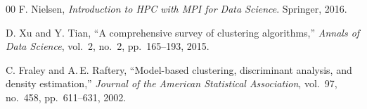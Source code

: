 \documentclass[conference]{IEEEtran}
\begin{document}
\begin{thebibliography}{00}
F. Nielsen,
\textit{Introduction to HPC with MPI for Data Science}.
Springer, 2016.

D. Xu and Y. Tian,
``A comprehensive survey of clustering algorithms,''
\textit{Annals of Data Science},
vol.~2, no.~2, pp.~165--193, 2015.

C. Fraley and A.\,E. Raftery,
``Model-based clustering, discriminant analysis, and density
estimation,''
\textit{Journal of the American Statistical Association},
vol.~97, no.~458, pp.~611--631, 2002.

\end{thebibliography}
\end{document}
